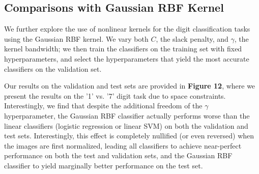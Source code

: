 \documentclass[10pt,psamsfonts]{amsart}
\theoremstyle{definition}
\theoremstyle{remark}
\numberwithin{equation}{section}
\begin{document}
\subsection{Comparisons with Gaussian RBF Kernel} We further explore the use of nonlinear kernels for the digit classification tasks using the Gaussian RBF kernel. We vary both $C$, the slack penalty, and $\gamma$, the kernel bandwidth; we then train the classifiers on the training set with fixed hyperparameters, and select the hyperparameters that yield the most accurate classifiers on the validation set.

Our results on the validation and test sets are provided in {\bf Figure 12}, where we present the results on the '1' vs. '7' digit task due to space constraints. Interestingly, we find that despite the additional freedom of the $\gamma$ hyperparameter, the Gaussian RBF classifier actually performs worse than the linear classifiers (logistic regression or linear SVM) on both the validation and test sets. Interestingly, this effect is completely nullified (or even reversed) when the images are first normalized, leading all classifiers to achieve near-perfect performance on both the test and validation sets, and the Gaussian RBF classifier to yield marginally better performance on the test set.
\end{document}
